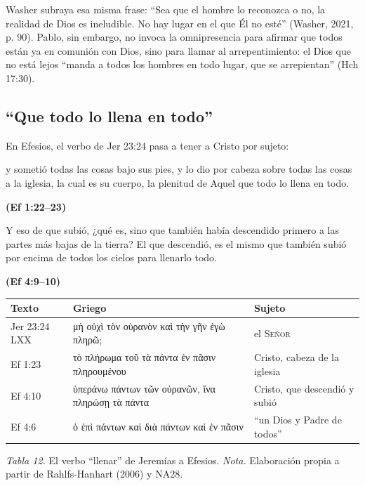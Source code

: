 \documentclass[11pt,letterpaper]{article}
\newcommand{\grc}[1]{\foreignlanguage{ancientgreek}{#1}}
\newcommand{\SENOR}{\textsc{Señor}}
\newcommand{\fuente}[1]{\par\hfill{\upshape\bfseries\small\textcolor{azul}{#1}}}
\begin{document}
Washer subraya esa misma frase: ``Sea que el hombre lo reconozca o no, la realidad de Dios es ineludible. No hay lugar en el que Él no esté'' (Washer, 2021, p. 90). Pablo, sin embargo, no invoca la omnipresencia para afirmar que todos están ya en comunión con Dios, sino para llamar al arrepentimiento: el Dios que no está lejos ``manda a todos los hombres en todo lugar, que se arrepientan'' (Hch 17:30).

\subsection{``Que todo lo llena en todo''}

En Efesios, el verbo de Jer 23:24 pasa a tener a Cristo por sujeto:

\begin{cita}y sometió todas las cosas bajo sus pies, y lo dio por cabeza sobre todas las cosas a la iglesia, la cual es su cuerpo, la plenitud de Aquel que todo lo llena en todo.\fuente{(Ef 1:22--23)}\end{cita}
\begin{cita}Y eso de que subió, ¿qué es, sino que también había descendido primero a las partes más bajas de la tierra? El que descendió, es el mismo que también subió por encima de todos los cielos para llenarlo todo.\fuente{(Ef 4:9--10)}\end{cita}

\begin{center}\small\renewcommand{\arraystretch}{1.22}
\begin{tabular}{@{}L{2.2cm}L{6.4cm}L{5.4cm}@{}}
\toprule
\textbf{Texto} & \textbf{Griego} & \textbf{Sujeto} \\ \midrule
Jer 23:24 LXX & \grc{μὴ οὐχὶ τὸν οὐρανὸν καὶ τὴν γῆν ἐγὼ πληρῶ;} & el \SENOR{} \\
Ef 1:23 & \grc{τὸ πλήρωμα τοῦ τὰ πάντα ἐν πᾶσιν πληρουμένου} & Cristo, cabeza de la iglesia \\
Ef 4:10 & \grc{ὑπεράνω πάντων τῶν οὐρανῶν, ἵνα πληρώσῃ τὰ πάντα} & Cristo, que descendió y subió \\
Ef 4:6 & \grc{ὁ ἐπὶ πάντων καὶ διὰ πάντων καὶ ἐν πᾶσιν} & ``un Dios y Padre de todos'' \\
\bottomrule
\end{tabular}\par
{\footnotesize\color{gris}\textit{Tabla 12.} El verbo ``llenar'' de Jeremías a Efesios. \textit{Nota.} Elaboración propia a partir de Rahlfs-Hanhart (2006) y NA28.}
\end{center}
\end{document}
